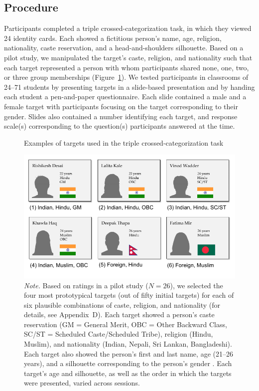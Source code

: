 \documentclass[12pt, a4paper]{article}
\begin{document}
\subsection{Procedure}

Participants completed a triple crossed-categorization task, in which they viewed 24 identity cards. Each showed a fictitious person’s name, age, religion, nationality, caste reservation, and a head-and-shoulders silhouette. Based on a pilot study, we manipulated the target’s caste, religion, and nationality such that each target represented a person with whom participants shared none, one, two, or three group memberships (Figure~\ref{fig:f2}). We tested participants in classrooms of 24--71 students by presenting targets in a slide-based presentation and by handing each student a pen-and-paper questionnaire. Each slide contained a male and a female target with participants focusing on the target corresponding to their gender. Slides also contained a number identifying each target, and response scale(s) corresponding to the question(s) participants answered at the time.

\begin{figure}
\caption{Examples of targets used in the triple crossed-categorization task}
\centering
\includegraphics[scale=1]{../figures/figure-2}
\caption*{\textit{Note.} Based on ratings in a pilot study ($N = 26$), we selected the four most prototypical targets (out of fifty initial targets) for each of six plausible combinations of caste, religion, and nationality (for details, see Appendix~D). Each target showed a person's caste reservation (GM = General Merit, OBC = Other Backward Class, SC/ST = Scheduled Caste/Scheduled Tribe), religion (Hindu, Muslim), and nationality (Indian, Nepali, Sri Lankan, Bangladeshi). Each target also showed the person's first and last name, age (21--26 years), and a silhouette corresponding to the person's gender \protect\parencite[adapted from][]{ma_chicago_2015}. Each target's age and silhouette, as well as the order in which the targets were presented, varied across sessions.}
\label{fig:f2}
\end{figure}
\end{document}
